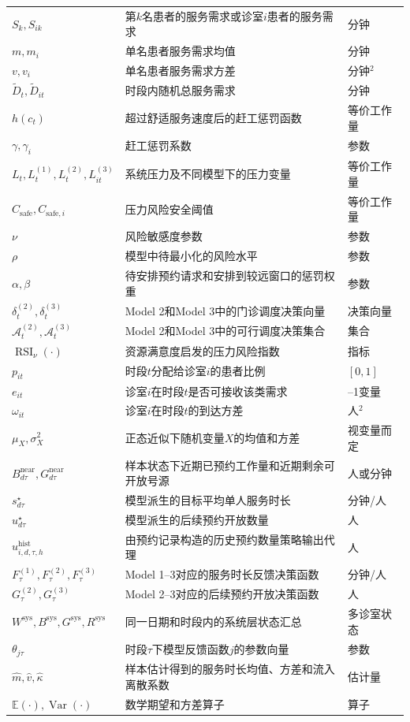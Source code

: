 \documentclass[a4paper,zihao=-4]{ctexart}
\newcommand{\E}{\mathbb{E}}
\newcommand{\Var}{\operatorname{Var}}
\newcommand{\RSI}{\operatorname{RSI}}
\numberwithin{figure}{section}
\numberwithin{table}{section}
\begin{document}
\begin{longtable}{>{\centering\arraybackslash}p{}>{\raggedright\arraybackslash}p{}>{\raggedright\arraybackslash}p{}}
  $S_k,S_{ik}$ & 第$k$名患者的服务需求或诊室$i$患者的服务需求 & 分钟 \\
  $m,m_i$ & 单名患者服务需求均值 & 分钟 \\
  $v,v_i$ & 单名患者服务需求方差 & 分钟$^2$ \\
  $\tilde D_t,\tilde D_{it}$ & 时段内随机总服务需求 & 分钟 \\
  $h(c_t)$ & 超过舒适服务速度后的赶工惩罚函数 & 等价工作量 \\
  $\gamma,\gamma_i$ & 赶工惩罚系数 & 参数 \\
  $L_t,L_t^{(1)},L_t^{(2)},L_{it}^{(3)}$ & 系统压力及不同模型下的压力变量 & 等价工作量 \\
  $C_{\mathrm{safe}},C_{\mathrm{safe},i}$ & 压力风险安全阈值 & 等价工作量 \\
  $\nu$ & 风险敏感度参数 & 参数 \\
  $\rho$ & 模型中待最小化的风险水平 & 参数 \\
  $\alpha,\beta$ & 待安排预约请求和安排到较远窗口的惩罚权重 & 参数 \\
  $\delta_t^{(2)},\delta_t^{(3)}$ & Model 2和Model 3中的门诊调度决策向量 & 决策向量 \\
  $\mathcal A_t^{(2)},\mathcal A_t^{(3)}$ & Model 2和Model 3中的可行调度决策集合 & 集合 \\
  $\RSI_\nu(\cdot)$ & 资源满意度启发的压力风险指数 & 指标 \\
  $p_{it}$ & 时段$t$分配给诊室$i$的患者比例 & $[0,1]$ \\
  $e_{it}$ & 诊室$i$在时段$t$是否可接收该类需求 & 0--1变量 \\
  $\omega_{it}$ & 诊室$i$在时段$t$的到达方差 & 人$^2$ \\
  $\mu_X,\sigma_X^2$ & 正态近似下随机变量$X$的均值和方差 & 视变量而定 \\
  $B_{d\tau}^{\mathrm{near}},G_{d\tau}^{\mathrm{near}}$ & 样本状态下近期已预约工作量和近期剩余可开放号源 & 人或分钟 \\
  $s_{d\tau}^{\star}$ & 模型派生的目标平均单人服务时长 & 分钟/人 \\
  $u_{d\tau}^{\star}$ & 模型派生的后续预约开放数量 & 人 \\
  $u_{i,d,\tau,h}^{\mathrm{hist}}$ & 由预约记录构造的历史预约数量策略输出代理 & 人 \\
  $F_{\tau}^{(1)},F_{\tau}^{(2)},F_{\tau}^{(3)}$ & Model 1--3对应的服务时长反馈决策函数 & 分钟/人 \\
  $G_{\tau}^{(2)},G_{\tau}^{(3)}$ & Model 2--3对应的后续预约开放决策函数 & 人 \\
  $W^{\mathrm{sys}},B^{\mathrm{sys}},G^{\mathrm{sys}},R^{\mathrm{sys}}$ & 同一日期和时段内的系统层状态汇总 & 多诊室状态 \\
  $\theta_{j\tau}$ & 时段$\tau$下模型反馈函数$j$的参数向量 & 参数 \\
  $\hat m,\hat v,\hat\kappa$ & 样本估计得到的服务时长均值、方差和流入离散系数 & 估计量 \\
  $\E(\cdot),\Var(\cdot)$ & 数学期望和方差算子 & 算子 \\
\end{longtable}
\endgroup
\end{document}

